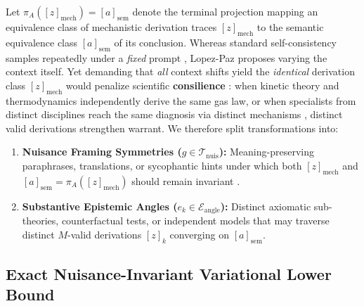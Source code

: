 \documentclass[11pt,a4paper]{article}
\theoremstyle{definition}
\theoremstyle{remark}
\begin{document}
Let $\pi_A([z]_{\mathrm{mech}}) = [a]_{\mathrm{sem}}$ denote the terminal projection mapping an equivalence class of mechanistic derivation traces $[z]_{\mathrm{mech}}$ to the semantic equivalence class $[a]_{\mathrm{sem}}$ of its conclusion. Whereas standard self-consistency samples repeatedly under a \emph{fixed} prompt \cite{wang2023selfconsistency,chen2023universal}, Lopez-Paz proposes varying the context itself. Yet demanding that \emph{all} context shifts yield the \emph{identical} derivation class $[z]_{\mathrm{mech}}$ would penalize scientific \textbf{consilience} \cite{whewell1840philosophy}: when kinetic theory and thermodynamics independently derive the same gas law, or when specialists from distinct disciplines reach the same diagnosis via distinct mechanisms \cite{lopezpaz2026against,wang2024unleashing}, distinct valid derivations strengthen warrant. We therefore split transformations into:
\begin{enumerate}[nosep,leftmargin=1.8em]
  \item \textbf{Nuisance Framing Symmetries ($g \in \mathcal{T}_{\mathrm{nuis}}$):} Meaning-preserving paraphrases, translations, or sycophantic hints under which both $[z]_{\mathrm{mech}}$ and $[a]_{\mathrm{sem}} = \pi_A([z]_{\mathrm{mech}})$ should remain invariant \cite{elazar2021measuring,arora2023ask,gupta2024context}.
  \item \textbf{Substantive Epistemic Angles ($e_k \in \mathcal{E}_{\mathrm{angle}}$):} Distinct axiomatic sub-theories, counterfactual tests, or independent models \cite{perplexity2026council} that may traverse distinct $M$-valid derivations $[z]_k$ converging on $[a]_{\mathrm{sem}}$.
\end{enumerate}

\subsection{Exact Nuisance-Invariant Variational Lower Bound}
\end{document}
